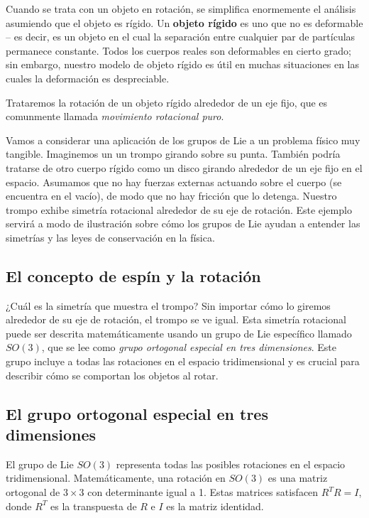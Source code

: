 \documentclass{article}
\begin{document}
Cuando se trata con un objeto en rotación, se simplifica enormemente el análisis asumiendo que el objeto es rígido. Un \textbf{objeto rígido} es uno que no es deformable -- es decir, es un objeto en el cual la separación entre cualquier par de partículas permanece constante. Todos los cuerpos reales son deformables en cierto grado; sin embargo, nuestro modelo de objeto rígido es útil en muchas situaciones en las cuales la deformación es despreciable.

Trataremos la rotación de un objeto rígido alrededor de un eje fijo, que es comunmente llamada \textit{movimiento rotacional puro}.

Vamos a considerar una aplicación de los grupos de Lie a un problema físico muy tangible. Imaginemos un un trompo girando sobre su punta. También podría tratarse de otro cuerpo rígido como un disco girando alrededor de un eje fijo en el espacio. Asumamos que no hay fuerzas externas actuando sobre el cuerpo (se encuentra en el vacío), de modo que no hay fricción que lo detenga. Nuestro trompo exhibe simetría rotacional alrededor de su eje de rotación. Este ejemplo servirá a modo de ilustración sobre cómo los grupos de Lie ayudan a entender las simetrías y las leyes de conservación en la física.

\subsection{El concepto de espín y la rotación}

¿Cuál es la simetría que muestra el trompo? Sin importar cómo lo giremos alrededor de su eje de rotación, el trompo se ve igual. Esta simetría rotacional puede ser descrita matemáticamente usando un grupo de Lie específico llamado $SO(3)$, que se lee como \textit{grupo ortogonal especial en tres dimensiones}. Este grupo incluye a todas las rotaciones en el espacio tridimensional y es crucial para describir cómo se comportan los objetos al rotar.

\subsection{El grupo ortogonal especial en tres dimensiones}

El grupo de Lie $SO(3)$ representa todas las posibles rotaciones en el espacio tridimensional. Matemáticamente, una rotación en $SO(3)$ es una matriz ortogonal de $3 \times 3$ con determinante igual a 1. Estas matrices satisfacen $R^T R = I$, donde $R^T$ es la transpuesta de $R$ e $I$ es la matriz identidad.
\end{document}

